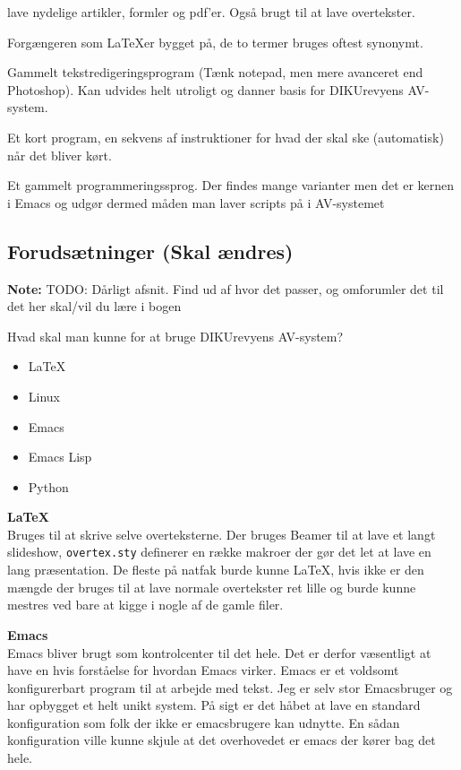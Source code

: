 \documentclass[10pt,a4paper,danish]{article}
\newcommand{\note}[1]{\begin{mdframed}[style=note]\textbf{Note:}
    #1\end{mdframed}}
\newcommand{\code}[1]{\colorbox{verbgray}{\texttt{#1}}}
\begin{document}
\begin{description}
  lave nydelige artikler, formler og pdf'er. Også brugt til at lave overtekster.
\item[\TeX:] Forgængeren som \LaTeX er bygget på, de to termer bruges oftest
  synonymt.
\item[Emacs:] Gammelt tekstredigeringsprogram (Tænk notepad, men mere avanceret
  end Photoshop). Kan udvides helt utroligt og danner basis for DIKUrevyens AV-system.
\item[Script:] Et kort program, en sekvens af instruktioner for hvad der skal
  ske (automatisk) når det bliver kørt.
\item[Lisp] Et gammelt programmeringssprog. Der findes mange varianter men det
  er kernen i Emacs og udgør dermed måden man laver scripts på i AV-systemet
\end{description}


\subsection{Forudsætninger (Skal ændres)}
\note{TODO: Dårligt afsnit. Find ud af hvor det passer, og omforumler det til
  det her skal/vil du lære i bogen}

Hvad skal man kunne for at bruge DIKUrevyens AV-system?

\begin{itemize}
\item \LaTeX
\item Linux
\item Emacs
\item Emacs Lisp
\item Python
\end{itemize}

\textbf{\LaTeX}\\
Bruges til at skrive selve overteksterne. Der bruges Beamer til at lave et langt
slideshow, \code{overtex.sty} definerer en række makroer der gør det let at lave en
lang præsentation.
De fleste på natfak burde kunne \LaTeX, hvis ikke er den mængde der bruges til
at lave normale overtekster ret lille og burde kunne mestres ved bare at kigge i
nogle af de gamle filer.

\textbf{Emacs}\\
Emacs bliver brugt som kontrolcenter til det hele.
Det er derfor væsentligt at have en hvis forståelse for hvordan Emacs virker.
Emacs er et voldsomt konfigurerbart program til at arbejde med tekst.
Jeg er selv stor Emacsbruger og har opbygget et helt unikt system.
På sigt er det håbet at lave en standard konfiguration som folk der ikke er
emacsbrugere kan udnytte. En sådan konfiguration ville kunne skjule at det
overhovedet er emacs der kører bag det hele.
\end{document}

